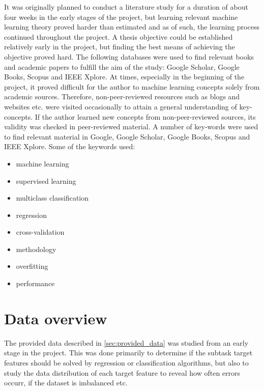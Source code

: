 	It was originally planned to conduct a literature study for a duration of about four weeks in the early stages of the project, but learning relevant machine learning theory proved harder than estimated and as of such, the learning process continued throughout the project. A thesis objective could be established relatively early in the project, but finding the best means of achieving the objective proved hard. The following databases were used to find relevant books and academic papers to fulfill the aim of the study: Google Scholar, Google Books, Scopus and IEEE Xplore. At times, especially in the beginning of the project, it proved difficult for the author to machine learning concepts solely from academic sources. Therefore, non-peer-reviewed resources such as blogs and websites etc. were visited occasionally to attain a general understanding of key-concepts. If the author learned new concepts from non-peer-reviewed sources, its validity was checked in peer-reviewed material. A number of key-words were used to find relevant material in Google, Google Scholar, Google Books, Scopus and IEEE Xplore. Some of the keywords used:

	\begin{itemize}
		\item machine learning
		\item supervised learning
		\item multiclass classification
		\item regression
		\item cross-validation
		\item methodology
		\item overfitting
		\item performance
	\end{itemize}

	
\section{Data overview}
	The provided data described in \ref{sec:provided_data} was studied from an early stage in the project. This was done primarily to determine if the subtask target features should be solved by regression or classification algorithms, but also to study the data distribution of each target feature to reveal how often errors occurr, if the dataset is imbalanced etc. 

